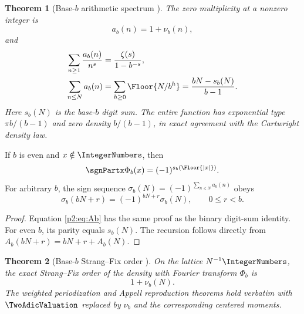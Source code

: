 \documentclass[11pt]{article}
\numberwithin{equation}{section}
\newtheorem{theorem}{Theorem}[section]
\theoremstyle{definition}
\theoremstyle{remark}
\begin{document}
\begin{theorem}[Base-$b$ arithmetic spectrum \NewResult]
\label{p2:thm:baseb}
The zero multiplicity at a nonzero integer is
\begin{equation}
 a_b(n)=1+\nu_b(n),                                       \label{p2:eq:ab}
\end{equation}
and
\begin{align}
 \sum_{n\ge1}\frac{a_b(n)}{n^s}
   &=\frac{\zeta(s)}{1-b^{-s}},                           \label{p2:eq:Db}\\
 \sum_{n\le N}a_b(n)
   &=\sum_{h\ge0}\Floor{N/b^h}
     =\frac{bN-s_b(N)}{b-1}.                              \label{p2:eq:Ab}\\
\end{align}
Here $s_b(N)$ is the base-$b$ digit sum.  The entire function has exponential
type $\pi b/(b-1)$ and zero density $b/(b-1)$, in exact agreement with the
Cartwright density law.
\end{theorem}

\begin{corollary}
If $b$ is even and $x\notin\IntegerNumbers$, then
\begin{equation}
 \sgnPartx\Phi_b(x)=(-1)^{s_b(\Floor{|x|})}.                   \label{p2:eq:baseb-sign}
\end{equation}
For arbitrary $b$, the sign sequence
$\sigma_b(N)=(-1)^{\sum_{n\le N}a_b(n)}$ obeys
\begin{equation}
 \sigma_b(bN+r)=(-1)^{bN+r}\sigma_b(N),
 \qquad 0\le r<b.                                         \label{p2:eq:sigmab-rec}
\end{equation}
\end{corollary}

\begin{proof}
Equation \eqref{p2:eq:Ab} has the same proof as the binary digit-sum identity.
For even $b$, its parity equals $s_b(N)$.  The recursion follows directly from
$A_b(bN+r)=bN+r+A_b(N)$.
\end{proof}

\begin{theorem}[Base-$b$ Strang--Fix order \NewResult]
On the lattice $N^{-1}\IntegerNumbers$, the exact Strang--Fix order of the density with
Fourier transform $\Phi_b$ is
\begin{equation}
 1+\nu_b(N).                                               \label{p2:eq:SFb}
\end{equation}
The weighted periodization and Appell reproduction theorems hold verbatim with
$\TwoAdicValuation$ replaced by $\nu_b$ and the corresponding centered moments.
\end{theorem}
\end{document}
